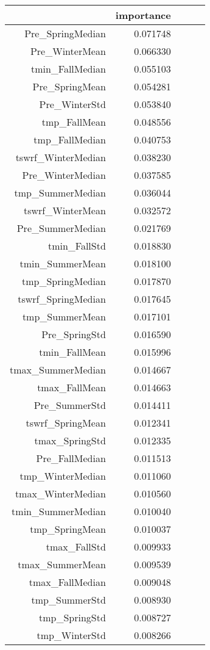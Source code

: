 \begin{table}[h]
\centering
\label{table:5}
\begin{tabular}{rrrrr}
\toprule
 & importance \\
\midrule
Pre_SpringMedian & 0.071748 \\
Pre_WinterMean & 0.066330 \\
tmin_FallMedian & 0.055103 \\
Pre_SpringMean & 0.054281 \\
Pre_WinterStd & 0.053840 \\
tmp_FallMean & 0.048556 \\
tmp_FallMedian & 0.040753 \\
tswrf_WinterMedian & 0.038230 \\
Pre_WinterMedian & 0.037585 \\
tmp_SummerMedian & 0.036044 \\
tswrf_WinterMean & 0.032572 \\
Pre_SummerMedian & 0.021769 \\
tmin_FallStd & 0.018830 \\
tmin_SummerMean & 0.018100 \\
tmp_SpringMedian & 0.017870 \\
tswrf_SpringMedian & 0.017645 \\
tmp_SummerMean & 0.017101 \\
Pre_SpringStd & 0.016590 \\
tmin_FallMean & 0.015996 \\
tmax_SummerMedian & 0.014667 \\
tmax_FallMean & 0.014663 \\
Pre_SummerStd & 0.014411 \\
tswrf_SpringMean & 0.012341 \\
tmax_SpringStd & 0.012335 \\
Pre_FallMedian & 0.011513 \\
tmp_WinterMedian & 0.011060 \\
tmax_WinterMedian & 0.010560 \\
tmin_SummerMedian & 0.010040 \\
tmp_SpringMean & 0.010037 \\
tmax_FallStd & 0.009933 \\
tmax_SummerMean & 0.009539 \\
tmax_FallMedian & 0.009048 \\
tmp_SummerStd & 0.008930 \\
tmp_SpringStd & 0.008727 \\
tmp_WinterStd & 0.008266 \\

\end{tabular}
\end{table}

